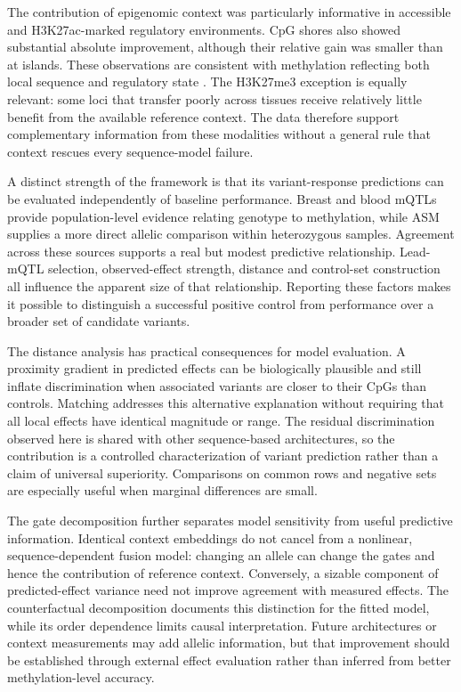 \documentclass[11pt,letterpaper,twocolumn]{article}
\begin{document}
The contribution of epigenomic context was particularly informative in accessible and H3K27ac-marked regulatory environments. CpG shores also showed substantial absolute improvement, although their relative gain was smaller than at islands. These observations are consistent with methylation reflecting both local sequence and regulatory state \cite{jones2012functions,schubeler2015function,encode2012integrated}. The H3K27me3 exception is equally relevant: some loci that transfer poorly across tissues receive relatively little benefit from the available reference context. The data therefore support complementary information from these modalities without a general rule that context rescues every sequence-model failure.

A distinct strength of the framework is that its variant-response predictions can be evaluated independently of baseline performance. Breast and blood mQTLs provide population-level evidence relating genotype to methylation, while ASM supplies a more direct allelic comparison within heterozygous samples. Agreement across these sources supports a real but modest predictive relationship. Lead-mQTL selection, observed-effect strength, distance and control-set construction all influence the apparent size of that relationship. Reporting these factors makes it possible to distinguish a successful positive control from performance over a broader set of candidate variants.

The distance analysis has practical consequences for model evaluation. A proximity gradient in predicted effects can be biologically plausible and still inflate discrimination when associated variants are closer to their CpGs than controls. Matching addresses this alternative explanation without requiring that all local effects have identical magnitude or range. The residual discrimination observed here is shared with other sequence-based architectures, so the contribution is a controlled characterization of variant prediction rather than a claim of universal superiority. Comparisons on common rows and negative sets are especially useful when marginal differences are small.

The gate decomposition further separates model sensitivity from useful predictive information. Identical context embeddings do not cancel from a nonlinear, sequence-dependent fusion model: changing an allele can change the gates and hence the contribution of reference context. Conversely, a sizable component of predicted-effect variance need not improve agreement with measured effects. The counterfactual decomposition documents this distinction for the fitted model, while its order dependence limits causal interpretation. Future architectures or context measurements may add allelic information, but that improvement should be established through external effect evaluation rather than inferred from better methylation-level accuracy.
\end{document}
